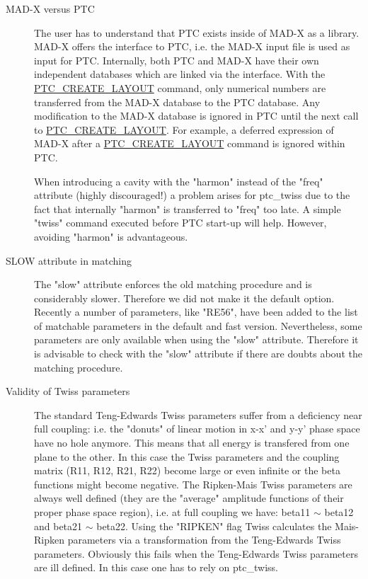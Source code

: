 \begin{description}
    \item[MAD-X versus PTC] 
    The user has to understand that PTC exists inside of MAD-X as a
    library. MAD-X offers the interface to PTC, i.e. the MAD-X input
    file is used as input for PTC. Internally, both PTC and MAD-X have
    their own independent databases which are linked via the
    interface. With the
    \href{../ptc_general/ptc_general.html#PTC_CREATE_LAYOUT}{PTC\_CREATE\_LAYOUT}
    command, only numerical numbers are transferred from the MAD-X
    database to the PTC database. Any modification to the MAD-X
    database is ignored in PTC until the next call to
    \href{../ptc_general/ptc_general.html#PTC_CREATE_LAYOUT}{PTC\_CREATE\_LAYOUT}.
    For example, a deferred expression of MAD-X after a
    \href{../ptc_general/ptc_general.html#PTC_CREATE_LAYOUT}{PTC\_CREATE\_LAYOUT}
    command is ignored within PTC.  
    
    When introducing a cavity with the "harmon" instead of the "freq"
    attribute (highly discouraged!) a problem arises for ptc\_twiss due to
    the fact that internally "harmon" is transferred to "freq" too late. A
    simple "twiss" command executed before PTC start-up will help. However,
    avoiding "harmon" is advantageous.  
    

    \item[SLOW attribute in matching] 
    The "slow" attribute enforces the old matching procedure and is
    considerably slower. Therefore we did not make it the default
    option. Recently a number of parameters, like "RE56", have been
    added to the list of matchable parameters in the default and fast
    version. Nevertheless, some parameters are only available when using
    the "slow" attribute. Therefore it is advisable to check with the
    "slow" attribute if there are doubts about the matching procedure.  



    \item[Validity of Twiss parameters]
    The standard Teng-Edwards Twiss parameters suffer from a deficiency near
    full coupling: i.e. the "donuts" of linear motion in x-x' and y-y' phase
    space have no hole anymore. This means that all energy is transfered
    from one plane to the other. In this case the Twiss parameters and the
    coupling matrix (R11, R12, R21, R22) become large or even infinite or
    the beta functions might become negative. The Ripken-Mais Twiss
    parameters are always well defined (they are the "average" amplitude
    functions of their proper phase space region), i.e. at full coupling we
    have: beta11 $\sim$ beta12 and beta21 $\sim$ beta22. Using the "RIPKEN"
    flag Twiss calculates the Mais-Ripken parameters via a transformation
    from the Teng-Edwards Twiss parameters. Obviously this fails when the
    Teng-Edwards Twiss parameters are ill defined. In this case one has to
    rely on ptc\_twiss.    

\end{description}


